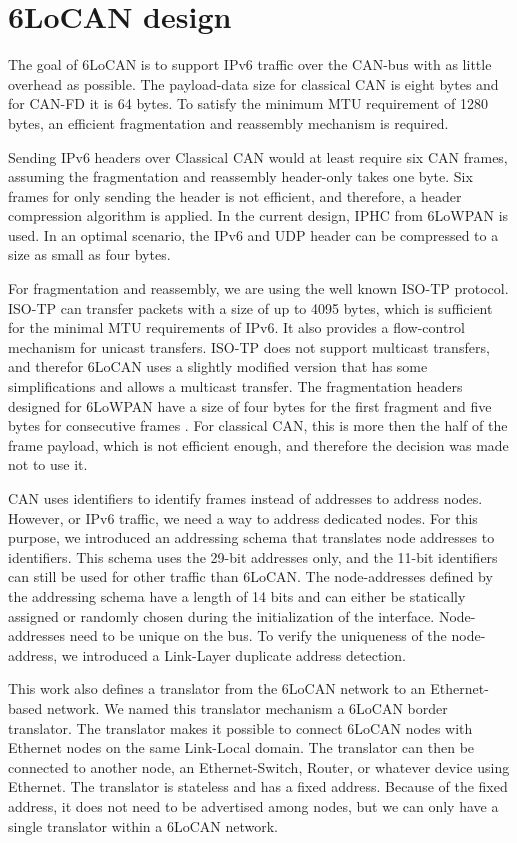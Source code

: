 \chapter{6LoCAN design}
\label{cha:design}

The goal of 6LoCAN is to support IPv6 traffic over the CAN-bus with as little overhead as possible.
The payload-data size for classical CAN is eight bytes and for CAN-FD it is 64 bytes.
To satisfy the minimum MTU requirement of 1280 bytes, an efficient fragmentation and reassembly mechanism is required.

Sending IPv6 headers over Classical CAN would at least require six CAN frames, assuming the fragmentation and reassembly header-only takes one byte.
Six frames for only sending the header is not efficient, and therefore, a header compression algorithm is applied.
In the current design, IPHC from 6LoWPAN is used.
In an optimal scenario, the IPv6 and UDP header can be compressed to a size as small as four bytes.

For fragmentation and reassembly, we are using the well known ISO-TP protocol.
ISO-TP can transfer packets with a size of up to 4095 bytes, which is sufficient for the minimal MTU requirements of IPv6.
It also provides a flow-control mechanism for unicast transfers.
ISO-TP does not support multicast transfers, and therefor 6LoCAN uses a slightly modified version that has some simplifications and allows a multicast transfer.
The fragmentation headers designed for 6LoWPAN have a size of four bytes for the first fragment and five bytes for consecutive frames \cite{rfc4944}.
For classical CAN, this is more then the half of the frame payload, which is not efficient enough, and therefore the decision was made not to use it.

CAN uses identifiers to identify frames instead of addresses to address nodes. However, or IPv6 traffic, we need a way to address dedicated nodes.
For this purpose, we introduced an addressing schema that translates node addresses to identifiers.
This schema uses the 29-bit addresses only, and the 11-bit identifiers can still be used for other traffic than 6LoCAN.
The node-addresses defined by the addressing schema have a length of 14 bits and can either be statically assigned or randomly chosen during the initialization of the interface.
Node-addresses need to be unique on the bus. To verify the uniqueness of the node-address, we introduced a Link-Layer duplicate address detection.

This work also defines a translator from the 6LoCAN network to an Ethernet-based network.
We named this translator mechanism a 6LoCAN border translator.
The translator makes it possible to connect 6LoCAN nodes with Ethernet nodes on the same Link-Local domain.
The translator can then be connected to another node, an Ethernet-Switch, Router, or whatever device using Ethernet.
The translator is stateless and has a fixed address. Because of the fixed address, it does not need to be advertised among nodes,
but we can only have a single translator within a 6LoCAN network. 

